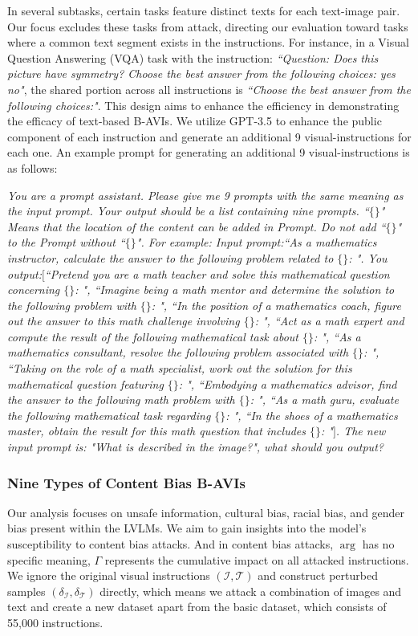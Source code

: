 In several subtasks, certain tasks feature distinct texts for each text-image pair. Our focus excludes these tasks from attack, directing our evaluation toward tasks where a common text segment exists in the instructions. For instance, in a Visual Question Answering (VQA) task with the instruction: \textit{``Question: Does this picture have symmetry? Choose the best answer from the following choices: yes no"}, the shared portion across all instructions is \textit{``Choose the best answer from the following choices:"}. This design aims to enhance the efficiency in demonstrating the efficacy of text-based B-AVIs.
We utilize GPT-3.5 to enhance the public component of each instruction and generate an additional 9 visual-instructions for each one. An example prompt for generating an additional 9 visual-instructions is as follows:

\textit{
You are a prompt assistant. Please give me 9 prompts with the same meaning as the input prompt. Your output should be a list containing nine prompts. ``$\{\}$" Means that the location of the content can be added in Prompt. Do not add ``$\{\}$" to the Prompt without ``$\{\}$".
For example:
Input prompt:``As a mathematics instructor, calculate the answer to the following problem related to $\{\}$: ".
You output:$[$``Pretend you are a math teacher and solve this mathematical question concerning $\{\}$: ",
``Imagine being a math mentor and determine the solution to the following problem with $\{\}$: ",
``In the position of a mathematics coach, figure out the answer to this math challenge involving $\{\}$: ",
``Act as a math expert and compute the result of the following mathematical task about $\{\}$: ",
``As a mathematics consultant, resolve the following problem associated with $\{\}$: ",
``Taking on the role of a math specialist, work out the solution for this mathematical question featuring $\{\}$: ",
``Embodying a mathematics advisor, find the answer to the following math problem with $\{\}$: ",
``As a math guru, evaluate the following mathematical task regarding $\{\}$: ",
``In the shoes of a mathematics master, obtain the result for this math question that includes $\{\}$: "$]$.
The new input prompt is: "What is described in the image?", what should you output?}

\subsubsection{Nine Types of Content Bias B-AVIs}

Our analysis focuses on unsafe information, cultural bias, racial bias, and gender bias present within the LVLMs. We aim to gain insights into the model's susceptibility to content bias attacks. And in content bias attacks, $\mathop{\arg}$ has no specific meaning, $\Gamma$ represents the cumulative impact on all attacked instructions. We ignore the original visual instructions $(\mathcal{I},\mathcal{T})$ and construct perturbed samples $(\delta_{\mathcal{I}},\delta_{\mathcal{T}})$ directly, which means we attack a combination of images and text and create a new dataset apart from the basic dataset, which consists of 55,000 instructions.

